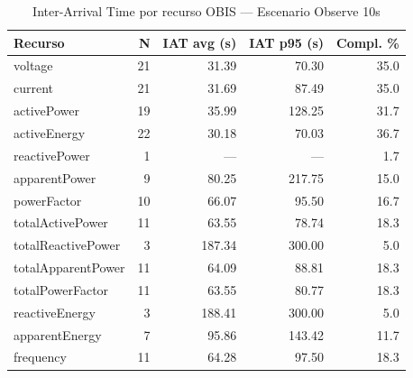 
\begin{table}[htbp]
\centering
\caption{Inter-Arrival Time por recurso OBIS — Escenario Observe 10s}
\label{tab:iat-per-key-10s}
\begin{tabular}{lrrrr}
\toprule
\textbf{Recurso} & \textbf{N} & \textbf{IAT avg (s)} & \textbf{IAT p95 (s)} & \textbf{Compl. \%} \\
\midrule
voltage & 21 & 31.39 & 70.30 & 35.0 \\
current & 21 & 31.69 & 87.49 & 35.0 \\
activePower & 19 & 35.99 & 128.25 & 31.7 \\
activeEnergy & 22 & 30.18 & 70.03 & 36.7 \\
reactivePower & 1 & --- & --- & 1.7 \\
apparentPower & 9 & 80.25 & 217.75 & 15.0 \\
powerFactor & 10 & 66.07 & 95.50 & 16.7 \\
totalActivePower & 11 & 63.55 & 78.74 & 18.3 \\
totalReactivePower & 3 & 187.34 & 300.00 & 5.0 \\
totalApparentPower & 11 & 64.09 & 88.81 & 18.3 \\
totalPowerFactor & 11 & 63.55 & 80.77 & 18.3 \\
reactiveEnergy & 3 & 188.41 & 300.00 & 5.0 \\
apparentEnergy & 7 & 95.86 & 143.42 & 11.7 \\
frequency & 11 & 64.28 & 97.50 & 18.3 \\
\bottomrule
\end{tabular}
\end{table}
